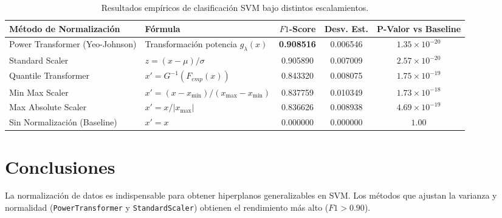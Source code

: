 \documentclass[11pt,a4paper]{article}
\begin{document}
\begin{table}[htbp]
\centering
\small
\begin{tabular}{l l c c c}
\toprule
\textbf{Método de Normalización} & \textbf{Fórmula} & \textbf{$F1$-Score} & \textbf{Desv. Est.} & \textbf{P-Valor vs Baseline} \\
\midrule
Power Transformer (Yeo-Johnson) & Transformación potencia $g_\lambda(x)$ & \textbf{0.908516} & 0.006546 & $1.35 \times 10^{-20}$ \\
Standard Scaler & $z = (x - \mu)/\sigma$ & 0.905890 & 0.007009 & $2.57 \times 10^{-20}$ \\
Quantile Transformer & $x' = G^{-1}(F_{emp}(x))$ & 0.843320 & 0.008075 & $1.75 \times 10^{-19}$ \\
Min Max Scaler & $x' = (x - x_{\min})/(x_{\max} - x_{\min})$ & 0.837759 & 0.010349 & $1.73 \times 10^{-18}$ \\
Max Absolute Scaler & $x' = x / |x_{\max}|$ & 0.836626 & 0.008938 & $4.69 \times 10^{-19}$ \\
Sin Normalización (Baseline) & $x' = x$ & 0.000000 & 0.000000 & $1.00$ \\
\bottomrule
\end{tabular}
\caption{Resultados empíricos de clasificación SVM bajo distintos escalamientos.}
\label{tab:resultados}
\end{table}

\section{Conclusiones}
La normalización de datos es indispensable para obtener hiperplanos generalizables en SVM. Los métodos que ajustan la varianza y normalidad (\texttt{PowerTransformer} y \texttt{StandardScaler}) obtienen el rendimiento más alto ($F1 > 0.90$).
\end{document}
